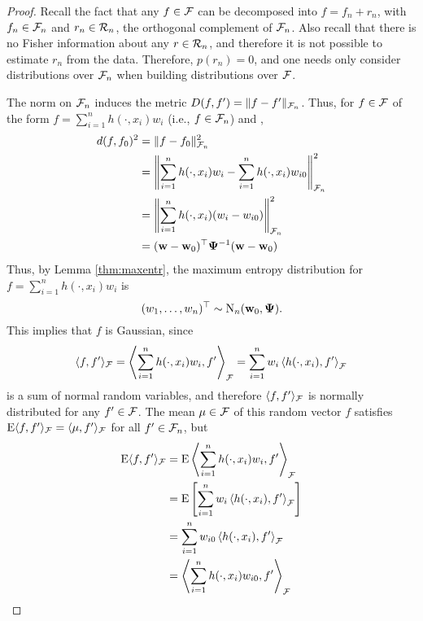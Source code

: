 \begin{proof}
  Recall the fact that any $f \in {\mathcal F}$ can be decomposed into $f = f_n + r_n$, with $f_n \in {\mathcal F}_n$ and $r_n \in {\mathcal R}_n$, the orthogonal complement of ${\mathcal F}_n$.
  Also recall that there is no Fisher information about any $r \in {\mathcal R}_n$, and therefore it is not possible to estimate $r_n$ from the data.
  Therefore, $p(r_n) = 0$, and one needs only consider distributions over ${\mathcal F}_n$ when building distributions over ${\mathcal F}$.
  
  The norm on ${\mathcal F}_n$ induces the metric $D(f,f') = \lVert f - f'\rVert_{{\mathcal F}_n}$.
  Thus, for $f \in {\mathcal F}$ of the form $f = \sum_{i=1}^n h(\cdot,x_i)w_i$ (i.e., $f \in {\mathcal F}_n$) and 
  ,
  \begin{align*}
    d(f,f_0)^2 
    &= \lVert f - f_0\rVert_{{\mathcal F}_n}^2 \\
    &= \left\Vert \sum_{i=1}^n h(\cdot,x_i)w_i - \sum_{i=1}^n h(\cdot,x_i)w_{i0} \right\Vert_{{\mathcal F}_n}^2 \\
    &= \left\Vert \sum_{i=1}^n h(\cdot,x_i)(w_i - w_{i0}) \right\Vert_{{\mathcal F}_n}^2 \\
    &= ({\mathbf w} - {\mathbf w}_0)^\top{\bm\Psi}^{-1} ({\mathbf w} - {\mathbf w}_0) 
  \end{align*}
  Thus, by Lemma \ref{thm:maxentr}, the maximum entropy distribution for $f = \sum_{i=1}^n h(\cdot,x_i)w_i$ is
  \[
    (w_1,\dots,w_n)^\top \sim \operatorname{N}_n({\mathbf w}_0,{\bm\Psi}).
  \]
  This implies that $f$ is Gaussian, since
  \begin{align*}
    \langle f,f' \rangle_{{\mathcal F}}
    = \left\langle \sum_{i=1}^n h(\cdot,x_i)w_i, f' \right\rangle_{{\mathcal F}} 
    = \sum_{i=1}^n w_i \left\langle  h(\cdot,x_i), f' \right\rangle_{{\mathcal F}}  
  \end{align*}
  is a sum of normal random variables, and therefore $\langle f,f' \rangle_{{\mathcal F}}$ is normally distributed for any $f' \in {\mathcal F}$.
  The mean $\mu\in{\mathcal F}$ of this random vector $f$ satisfies $\operatorname{E}\langle f,f'\rangle_{{\mathcal F}}  = \langle\mu,f'\rangle_{{\mathcal F}}$ for all $f'\in{\mathcal F}_n$, but
  \begin{align*}
    \E\ip{f,f'}_{\cF}  
    &= \E \left\langle \sum_{i=1}^n h(\cdot,x_i)w_i, f' \right\rangle_{\cF} \\
    &= \E \left[ \sum_{i=1}^n w_i \left\langle  h(\cdot,x_i), f' \right\rangle_{\cF} \right] \\
    &= \sum_{i=1}^n w_{i0} \left\langle  h(\cdot,x_i), f' \right\rangle_{\cF} \\
    &= \left\langle \sum_{i=1}^n h(\cdot,x_i)w_{i0}, f' \right\rangle_{\cF} \\

\end{align*}
\end{proof}
